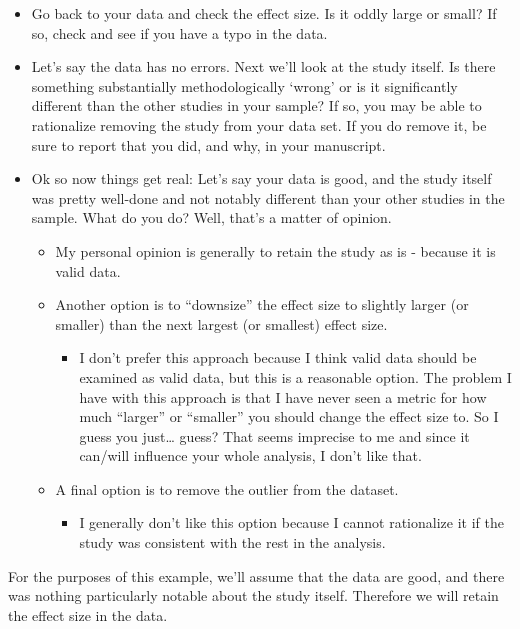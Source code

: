 \documentclass[
]{book}
\providecommand{\tightlist}{%
  \setlength{\itemsep}{0pt}\setlength{\parskip}{0pt}}
\begin{document}
\begin{itemize}
\item
  Go back to your data and check the effect size. Is it oddly large or small? If so, check and see if you have a typo in the data.
\item
  Let's say the data has no errors. Next we'll look at the study itself. Is there something substantially methodologically `wrong' or is it significantly different than the other studies in your sample? If so, you may be able to rationalize removing the study from your data set. If you do remove it, be sure to report that you did, and why, in your manuscript.
\item
  Ok so now things get real: Let's say your data is good, and the study itself was pretty well-done and not notably different than your other studies in the sample. What do you do? Well, that's a matter of opinion.

  \begin{itemize}
  \item
    My personal opinion is generally to retain the study as is - because it is valid data.
  \item
    Another option is to ``downsize'' the effect size to slightly larger (or smaller) than the next largest (or smallest) effect size.

    \begin{itemize}
    \tightlist
    \item
      I don't prefer this approach because I think valid data should be examined as valid data, but this is a reasonable option. The problem I have with this approach is that I have never seen a metric for how much ``larger'' or ``smaller'' you should change the effect size to. So I guess you just\ldots{} guess? That seems imprecise to me and since it can/will influence your whole analysis, I don't like that.
    \end{itemize}
  \item
    A final option is to remove the outlier from the dataset.

    \begin{itemize}
    \tightlist
    \item
      I generally don't like this option because I cannot rationalize it if the study was consistent with the rest in the analysis.
    \end{itemize}
  \end{itemize}
\end{itemize}

For the purposes of this example, we'll assume that the data are good, and there was nothing particularly notable about the study itself. Therefore we will retain the effect size in the data.
\end{document}
